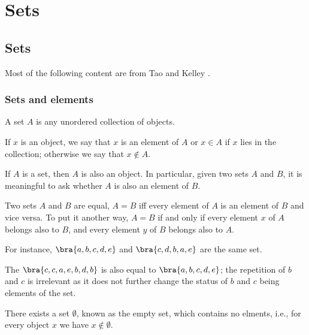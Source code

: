 \chapter{Sets}

\section{Sets}

Most of the following content are from Tao \cite{Tao_2006_1} and Kelley \cite{Kelley_1955}.

\subsection{Sets and elements}

\begin{definition}\label{def:set}
A set $A$ is any unordered collection of objects.

If $x$ is an object, we say that $x$ is an element of $A$ or $x\in A$ if $x$ lies in the collection; otherwise we say that $x\notin A$.
\end{definition}

\begin{axiom}
If $A$ is a set, then $A$ is also an object. In particular, given two sets $A$ and $B$, it is meaningful to ask whether $A$ is also an element of $B$.
\end{axiom}

\begin{definition}\label{def:equality_set}
Two sets $A$ and $B$ are equal, $A=B$ iff every element of $A$ is an element of $B$ and vice versa. To put it another way, $A=B$ if and only if every element $x$ of $A$ belongs also to $B$, and every element $y$ of $B$ belongs also to $A$.
\end{definition}

\begin{example}
For instance, $\bra{a,b,c,d,e}$ and $\bra{c,d,b,a,e}$ are the same set.

The $\bra{c,c,a,e,b,d,b}$ is also equal to $\bra{a,b,c,d,e}$; the repetition of $b$ and $c$ is irrelevant as it does not further change the status of $b$ and $c$ being elements of the set.
\end{example}

\begin{axiom}\label{axm:empty_set}
There exists a set $\emptyset$, known as the empty set, which contains no elments, i.e., for every object $x$ we have $x\notin \emptyset$.
\end{axiom}

